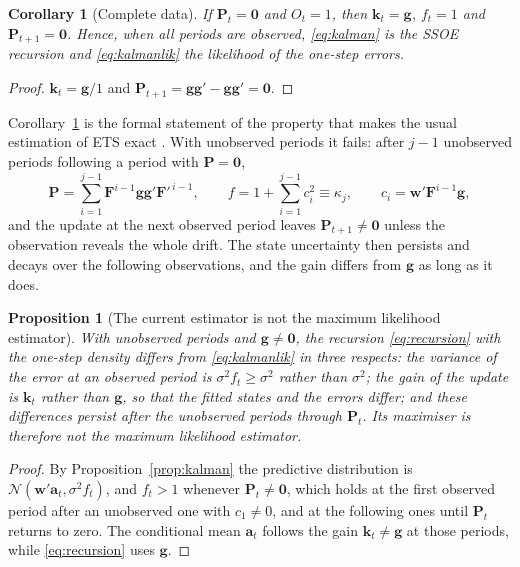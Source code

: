 \documentclass[11pt,a4paper]{article}
\newcommand{\vect}[1]{\mathbf{#1}}
\newtheorem{proposition}{Proposition}
\newtheorem{corollary}{Corollary}
\theoremstyle{remark}
\begin{document}
\begin{corollary}[Complete data]
\label{cor:complete}
If $\vect P_t = \vect 0$ and $O_t = 1$, then $\vect k_t = \vect g$, $f_t = 1$ and
$\vect P_{t+1} = \vect 0$. Hence, when all periods are observed, \eqref{eq:kalman} is the SSOE
recursion and \eqref{eq:kalmanlik} the likelihood of the one-step errors.
\end{corollary}

\begin{proof}
$\vect k_t = \vect g/1$ and $\vect P_{t+1} = \vect g\vect g' - \vect g\vect g' = \vect 0$.
\end{proof}

Corollary~\ref{cor:complete} is the formal statement of the property that makes the usual
estimation of ETS exact \citep{OrdKoehlerSnyder1997}. With unobserved periods it fails: after
$j-1$ unobserved periods following a period with $\vect P = \vect 0$,
\begin{equation}
\vect P = \sum_{i=1}^{j-1}\vect F^{i-1}\vect g\vect g'\vect F'^{\,i-1}, \qquad
f = 1 + \sum_{i=1}^{j-1}c_i^2 \equiv \kappa_j, \qquad c_i = \vect w'\vect F^{i-1}\vect g,
\label{eq:kappa}
\end{equation}
and the update at the next observed period leaves $\vect P_{t+1}\neq\vect 0$ unless the observation
reveals the whole drift. The state uncertainty then persists and decays over the following
observations, and the gain differs from $\vect g$ as long as it does.

\begin{proposition}[The current estimator is not the maximum likelihood estimator]
\label{prop:notmle}
With unobserved periods and $\vect g\neq\vect 0$, the recursion \eqref{eq:recursion} with the
one-step density differs from \eqref{eq:kalmanlik} in three respects: the variance of the error
at an observed period is $\sigma^2 f_t\geq\sigma^2$ rather than $\sigma^2$; the gain of the update is
$\vect k_t$ rather than $\vect g$, so that the fitted states and the errors differ; and these
differences persist after the unobserved periods through $\vect P_t$. Its maximiser is therefore not
the maximum likelihood estimator.
\end{proposition}

\begin{proof}
By Proposition~\ref{prop:kalman} the predictive distribution is $\mathcal N(\vect w'\vect a_t,
\sigma^2 f_t)$, and $f_t > 1$ whenever $\vect P_t\neq\vect 0$, which holds at the first observed period
after an unobserved one with $c_1\neq 0$, and at the following ones until $\vect P_t$ returns to zero.
The conditional mean $\vect a_t$ follows the gain $\vect k_t\neq\vect g$ at those periods, while
\eqref{eq:recursion} uses $\vect g$.
\end{proof}
\end{document}
